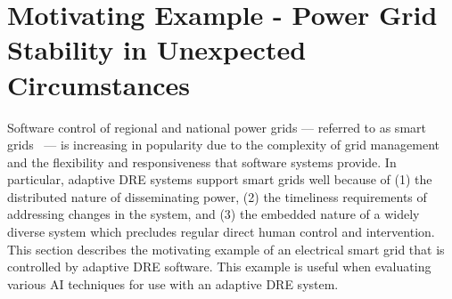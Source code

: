\documentclass[conference]{IEEEtran}
\begin{document}
%


\section{Motivating Example - Power Grid Stability in Unexpected Circumstances}
\label{example}

Software control of regional and national power grids --- referred to as smart grids~\cite{Ramchurn:12} --- is increasing in popularity due to the complexity of grid management and the flexibility and responsiveness that software systems provide. In particular, adaptive DRE systems support smart grids well because of (1) the distributed nature of disseminating power, (2) the timeliness requirements of addressing changes in the system, and (3) the embedded nature of a widely diverse system which precludes regular direct human control and intervention. This section describes the motivating example of an electrical smart grid that is controlled by adaptive DRE software. This example is useful when evaluating various AI techniques for use with an adaptive DRE system.
\end{document}
